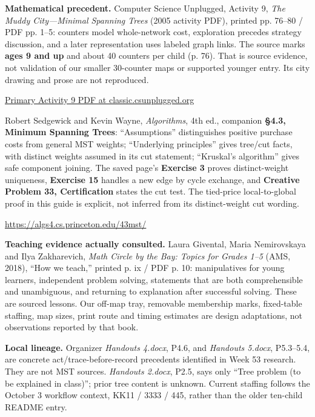 \documentclass[11pt,letterpaper]{article}
\newcommand\topic[1]{\par\vspace{5pt}{\large\bfseries #1}\par}
\begin{document}
\topic{Source evidence, authorship and use limits}
\textbf{Mathematical precedent.} Computer Science Unplugged, Activity 9, \emph{The Muddy City---Minimal Spanning Trees} (2005 activity PDF), printed pp. 76--80 / PDF pp. 1--5: counters model whole-network cost, exploration precedes strategy discussion, and a later representation uses labeled graph links. The source marks \textbf{ages 9 and up} and about 40 counters per child (p. 76). That is source evidence, not validation of our smaller 30-counter maps or supported younger entry. Its city drawing and prose are not reproduced.\par
\href{https://classic.csunplugged.org/documents/activities/minimal-spanning-trees/unplugged-09-minimal_spanning_trees.pdf}{Primary Activity 9 PDF at classic.csunplugged.org}

Robert Sedgewick and Kevin Wayne, \emph{Algorithms}, 4th ed., companion \textbf{\S4.3, Minimum Spanning Trees}: ``Assumptions'' distinguishes positive purchase costs from general MST weights; ``Underlying principles'' gives tree/cut facts, with distinct weights assumed in its cut statement; ``Kruskal's algorithm'' gives safe component joining. The saved page's \textbf{Exercise 3} proves distinct-weight uniqueness, \textbf{Exercise 15} handles a new edge by cycle exchange, and \textbf{Creative Problem 33, Certification} states the cut test. The tied-price local-to-global proof in this guide is explicit, not inferred from its distinct-weight cut wording.\par
\url{https://algs4.cs.princeton.edu/43mst/}

\textbf{Teaching evidence actually consulted.} Laura Givental, Maria Nemirovskaya and Ilya Zakharevich, \emph{Math Circle by the Bay: Topics for Grades 1--5} (AMS, 2018), ``How we teach,'' printed p. ix / PDF p. 10: manipulatives for young learners, independent problem solving, statements that are both comprehensible and unambiguous, and returning to explanation after successful solving. These are sourced lessons. Our off-map tray, removable membership marks, fixed-table staffing, map sizes, print route and timing estimates are design adaptations, not observations reported by that book.

\textbf{Local lineage.} Organizer \emph{Handouts 4.docx}, P4.6, and \emph{Handouts 5.docx}, P5.3--5.4, are concrete act/trace-before-record precedents identified in Week 53 research. They are not MST sources. \emph{Handouts 2.docx}, P2.5, says only ``Tree problem (to be explained in class)''; prior tree content is unknown. Current staffing follows the October 3 workflow context, KK11 / 3333 / 445, rather than the older ten-child README entry.
\end{document}
